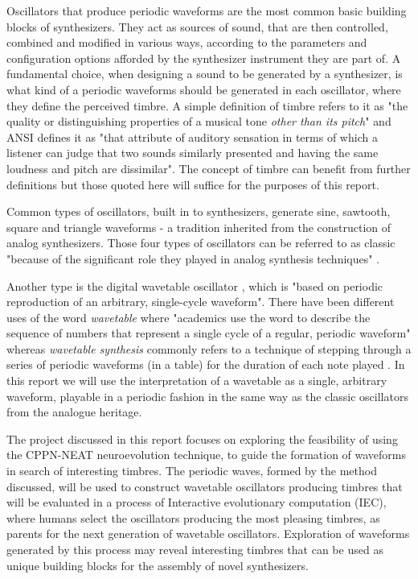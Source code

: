 \documentclass[conference]{IEEEtran}
\begin{document}
Oscillators that produce periodic waveforms are the most common basic building blocks of synthesizers.  They act as sources of sound, that are then controlled, combined and modified in various ways, according to the parameters and configuration options afforded by the synthesizer instrument they are part of.  A fundamental choice, when designing a sound to be generated by a synthesizer, is what kind of a periodic waveforms should be generated in each oscillator, where they define the perceived timbre.  A simple definition of timbre refers to it as "the quality or distinguishing properties of a musical tone \textit{other than its pitch}" \cite{david2009mathematics} and ANSI defines it as "that attribute of auditory sensation in terms of which a listener can judge that two sounds similarly presented and having the same loudness and pitch are dissimilar"\cite{american1960acoustical}.  The concept of timbre can benefit from further definitions \cite[p.~42]{mcdermott2008evolutionary}\cite{patterson2010reviewing}\cite{timbreWikipedia} but those quoted here will suffice for the purposes of this report.

Common types of oscillators, built in to synthesizers, generate sine, sawtooth, square and triangle waveforms - a tradition inherited from the construction of analog synthesizers.  Those four types of oscillators can be referred to as classic "because of the significant role they played in analog synthesis techniques" \cite{classicWaveshapes}. 

Another type is the digital wavetable oscillator \cite{oscAndWavetablesTheory}, which is "based on periodic reproduction of an arbitrary, single-cycle waveform"\cite{wikipedia-Wavetable-synthesis}.  There have been different uses of the word \textit{wavetable} where "academics use the word to describe the sequence of numbers that represent a single cycle of a regular, periodic waveform"\cite{Thor-demystified-11} whereas \textit{wavetable synthesis} commonly refers to a technique of stepping through a series of periodic waveforms (in a table) for the duration of each note played \cite{origins-of-wavetable}.  In this report we will use the interpretation of a wavetable as a single, arbitrary waveform, playable in a periodic fashion in the same way as the classic oscillators from the analogue heritage.

The project discussed in this report focuses on exploring the feasibility of using the CPPN-NEAT neuroevolution technique, to guide the formation of waveforms in search of interesting timbres.  The periodic waves, formed by the method discussed, will be used to construct wavetable oscillators producing timbres that will be evaluated in a process of Interactive evolutionary computation (IEC), where humans select the oscillators producing the most pleasing timbres, as parents for the next generation of wavetable oscillators.  Exploration of waveforms generated by this process may reveal interesting timbres that can be used as unique building blocks for the assembly of novel synthesizers.
\end{document}
